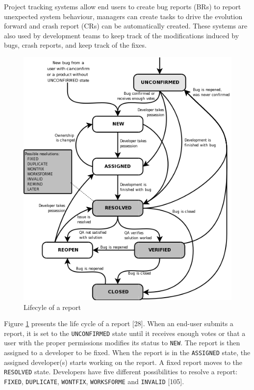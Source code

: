 \documentclass[12pt]{report}
\begin{document}
Project tracking systems allow end users to create bug reports (BRs) to
report unexpected system behaviour, managers can create tasks to drive
the evolution forward and crash report (CRs) can be automatically
created. These systems are also used by development teams to keep track
of the modifications induced by bugs, crash reports, and keep track of
the fixes.

\begin{figure}[h!]
    \centering
    \includegraphics[scale=0.7]{media/bzLifecycle.png}
    \caption{Lifecyle of a report}
    \label{fig:bug-lifecyle}
\end{figure}

Figure \ref{fig:bug-lifecyle} presents the life cycle of a report
{[}28{]}. When an end-user submits a report, it is set to the
\lstinline!UNCONFIRMED! state until it receives enough votes or that a
user with the proper permissions modifies its status to \lstinline!NEW!.
The report is then assigned to a developer to be fixed. When the report
is in the \lstinline!ASSIGNED! state, the assigned developer(s) starts
working on the report. A fixed report moves to the \lstinline!RESOLVED!
state. Developers have five different possibilities to resolve a report:
\lstinline!FIXED!, \lstinline!DUPLICATE!, \lstinline!WONTFIX!,
\lstinline!WORKSFORME! and \lstinline!INVALID! {[}105{]}.
\end{document}
